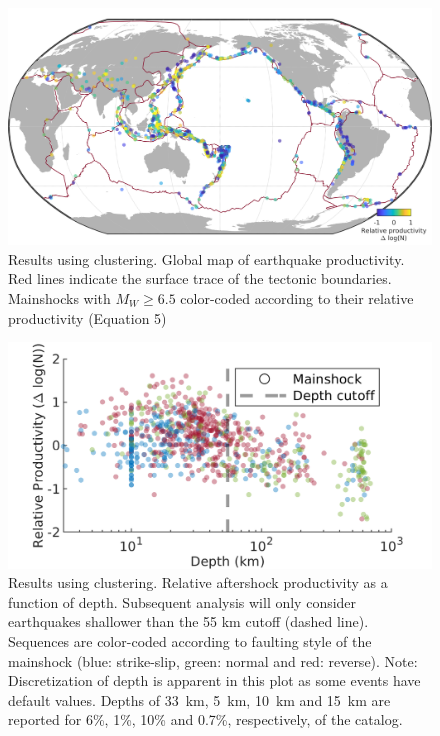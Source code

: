 \documentclass[draft]{agujournal}
\begin{document}
\begin{figure}[H]
    \centering

        \includegraphics[width = \linewidth]{figures/worldmap_res_z2008.png}
    
    \caption{Results using \citet{Zaliapin2008} clustering. Global map of earthquake productivity. Red lines indicate the surface trace of the tectonic boundaries. Mainshocks with $M_W\ge6.5$ color-coded according to their relative productivity (Equation 5)}
\end{figure}


\begin{figure}[H]
    \centering

        \includegraphics{figures/prod_vs_depth_z2008.png}
    
    \caption{Results using \citet{Zaliapin2008} clustering. Relative aftershock productivity as a function of depth. Subsequent analysis will only consider earthquakes shallower than the 55 km cutoff (dashed line). Sequences are color-coded according to faulting style of the mainshock (blue: strike-slip, green: normal and red: reverse). Note: Discretization of depth is apparent in this plot as some events have default values. Depths of  33~km, 5~km, 10~km and 15~km are reported for  6\%, 1\%, 10\% and 0.7\%, respectively, of the catalog.}
\end{figure}
\end{document}
